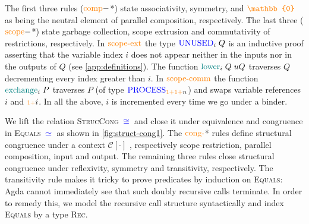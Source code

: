 \documentclass[sigplan,10pt,anonymous,review]{acmart}
\theoremstyle{definition}
\newcommand{\type}[1]{\textcolor{blue}{\operatorname{#1}}}
\newcommand{\constr}[1]{\textcolor{orange}{\operatorname{#1}}}
\newcommand{\func}[1]{\textcolor{teal}{\operatorname{#1}}}
\newcommand{\PO}{\constr{\mathbb{0}}}
\newcommand{\suc}{\constr{\scriptstyle 1+}}
\newcommand{\Process}{\type{PROCESS}}
\newcommand{\Unused}{\type{UNUSED}}
\newcommand{\eq}[1]{\, \type{\simeq}_{#1} \,}
\newcommand{\eqeq}{\, \type{\cong} \,}
\begin{document}
The first three rules ($\constr{comp}-$*) state associativity, symmetry, and $\PO$ as being the neutral element of parallel composition, respectively.
The last three ($\constr{scope}-$*) state garbage collection, scope extrusion and commutativity of restrictions, respectively.
In $\constr{scope-ext}$ the type $\Unused_i \; Q$ is an inductive proof asserting that the variable index $i$ does not appear neither in the inputs nor in the outputs of $Q$ (see \autoref{app:definitions}).
The function $\func{lower}_i \; Q \; uQ$ traverses $Q$ decrementing every index greater than $i$.
In $\constr{scope-comm}$ the function $\func{exchange}_i \; P$ traverses $P$ (of type $\allowbreak \Process_{\suc \suc n}$) and swaps variable references $i$ and $\suc i$.
In all the above, $i$ is incremented every time we go under a binder.
  
We lift the relation \textsc{StrucCong} $\eqeq{}$ and close it under equivalence and congruence in \textsc{Equals} $\eq{}$ as shown in \autoref{fig:struct-cong1}.
The $\constr{cong-}$* rules define structural congruence under a context $\mathcal{C}[\cdot]$ \cite{Sangio01}, respectively scope restriction, parallel composition, input and output.
The remaining three rules close structural congruence under reflexivity, symmetry and transitivity, respectively. 
The transitivity rule makes it tricky to prove predicates by induction on \textsc{Equals}: Agda cannot immediately see that such doubly recursive calls terminate.
In order to remedy this, we model the recursive call structure syntactically and index \textsc{Equals} by a type \textsc{Rec}.
\end{document}
